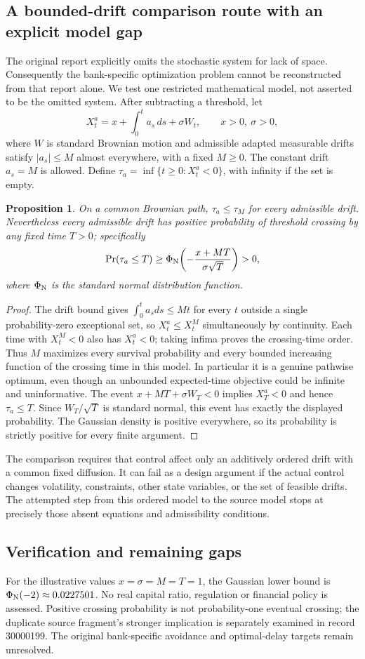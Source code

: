 \documentclass[11pt]{article}
\newtheorem{proposition}{Proposition}
\begin{document}
\subsection{A bounded-drift comparison route with an explicit model gap}
The original report explicitly omits the stochastic system for lack of space. Consequently the bank-specific optimization problem cannot be reconstructed from that report alone. We test one restricted mathematical model, not asserted to be the omitted system. After subtracting a threshold, let
\[
X_t^a=x+\int_0^t a_s\,ds+\sigma W_t,
\qquad x>0,\ \sigma>0,
\]
where $W$ is standard Brownian motion and admissible adapted measurable drifts satisfy $|a_s|\le M$ almost everywhere, with a fixed $M\ge0$. The constant drift $a_s=M$ is allowed. Define $\tau_a=\inf\{t\ge0:X_t^a<0\}$, with infinity if the set is empty.
\begin{proposition}
On a common Brownian path, $\tau_a\le\tau_M$ for every admissible drift. Nevertheless every admissible drift has positive probability of threshold crossing by any fixed time $T>0$; specifically
\[
\Pr(\tau_a\le T)\ge
\Phi_{\rm N}\!\left(-\frac{x+MT}{\sigma\sqrt T}\right)>0,
\]
where $\Phi_{\rm N}$ is the standard normal distribution function.
\end{proposition}
\begin{proof}
The drift bound gives $\int_0^t a_sds\le Mt$ for every $t$ outside a single probability-zero exceptional set, so $X_t^a\le X_t^M$ simultaneously by continuity. Each time with $X_t^M<0$ also has $X_t^a<0$; taking infima proves the crossing-time order. Thus $M$ maximizes every survival probability and every bounded increasing function of the crossing time in this model. In particular it is a genuine pathwise optimum, even though an unbounded expected-time objective could be infinite and uninformative.
The event $x+MT+\sigma W_T<0$ implies $X_T^a<0$ and hence $\tau_a\le T$. Since $W_T/\sqrt T$ is standard normal, this event has exactly the displayed probability. The Gaussian density is positive everywhere, so its probability is strictly positive for every finite argument.
\end{proof}
The comparison requires that control affect only an additively ordered drift with a common fixed diffusion. It can fail as a design argument if the actual control changes volatility, constraints, other state variables, or the set of feasible drifts. The attempted step from this ordered model to the source model stops at precisely those absent equations and admissibility conditions.
\subsection{Verification and remaining gaps}
For the illustrative values $x=\sigma=M=T=1$, the Gaussian lower bound is $\Phi_{\rm N}(-2)\approx0.0227501$. No real capital ratio, regulation or financial policy is assessed. Positive crossing probability is not probability-one eventual crossing; the duplicate source fragment's stronger implication is separately examined in record 30000199. The original bank-specific avoidance and optimal-delay targets remain unresolved.
\end{document}

